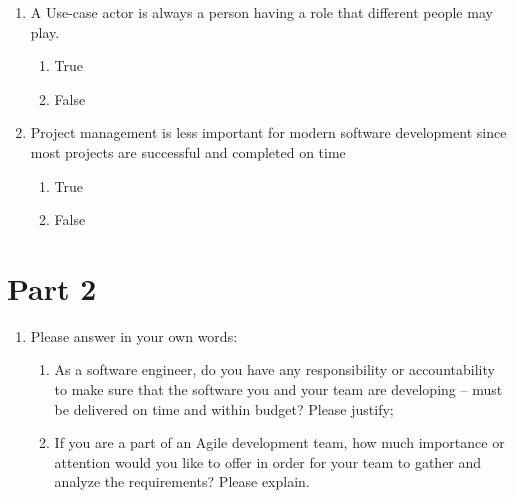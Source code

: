\documentclass[12pt]{article}
\newcommand{\answeritem}{\global\answertrue\item}
\newcommand{\perhapsanswer}{%
  \ifanswer
    $\blacksquare$ \global\answerfalse
  \else
    $\square$ \global\answerfalse
  \fi
}
\newif\ifanswer
\begin{document}
\begin{enumerate}
    \item A Use-case actor is always a person having a role that different people may play.
    \begin{enumerate}[start=1,align=left,label={\protect\perhapsanswer(\alph*)}]
      \item True
      \answeritem False
    \end{enumerate}

    \item Project management is less important for modern software development since most projects are successful and completed on time
    \begin{enumerate}[start=1,align=left,label={\protect\perhapsanswer(\alph*)}]
      \answeritem True
      \item False
    \end{enumerate}

  \end{enumerate}

  \section*{Part 2}

  \begin{enumerate}[resume]

    \item Please answer in your own words:

    \begin{enumerate}
      \item As a software engineer, do you have any responsibility or accountability to make sure that the software you and your team are developing – must be delivered on time and within budget? Please justify;

      \item If you are a part of an Agile development team, how much importance or attention would you like to offer in order for your team to gather and analyze the requirements? Please explain.
    \end{enumerate}

  \end{enumerate}
\end{document}
